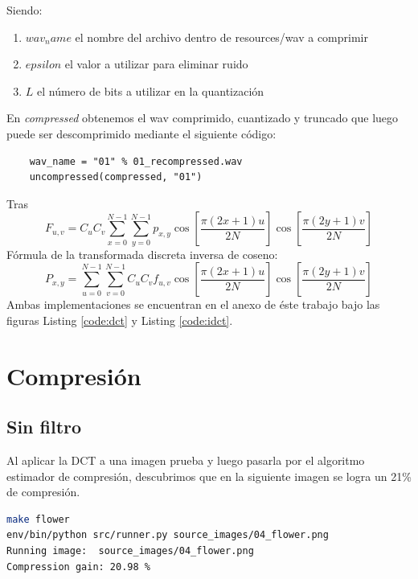 \documentclass[spanish]{scrartcl}
\begin{document}
Siendo:
\begin{enumerate}
    \item $wav_name$ el nombre del archivo dentro de resources/wav a comprimir
    \item $epsilon$ el valor a utilizar para eliminar ruido
    \item $L$ el número de bits a utilizar en la quantización
\end{enumerate}
En \textit{compressed} obtenemos el wav comprimido, cuantizado y truncado que luego puede ser descomprimido mediante el siguiente código:
\begin{lstlisting}
    wav_name = "01" % 01_recompressed.wav
    uncompressed(compressed, "01")
\end{lstlisting}
Tras
\begin{equation}
\label{eq:dct}
F_{u,v} =
 C_{u} C_{v} \sum_{x=0}^{N-1}
 \sum_{y=0}^{N-1}
 p_{x,y}
\cos \left[\frac{\pi \left(2 x + 1\right) u}{2 N} \right]
\cos \left[\frac{\pi \left(2 y + 1\right) v}{2 N} \right]
\end{equation}
Fórmula de la transformada discreta inversa de coseno\cite{mathworks_DCT}:
\begin{equation}
\label{eq:idct}
P_{x,y} =
 \sum_{u=0}^{N-1}
 \sum_{v=0}^{N-1}
 C_{u} C_{v}
 f_{u,v}
\cos \left[\frac{\pi \left(2 x + 1\right) u}{2 N} \right]
\cos \left[\frac{\pi \left(2 y + 1\right) v}{2 N} \right]
\end{equation}
Ambas implementaciones se encuentran en el anexo de éste trabajo bajo las figuras Listing \ref{code:dct} y Listing \ref{code:idct}.

\section{Compresión}
\subsection{Sin filtro}

Al aplicar la DCT a una imagen prueba y luego pasarla por el algoritmo estimador de compresión, descubrimos que en la siguiente imagen se logra un 21\% de compresión.
\begin{lstlisting}[language=bash]
make flower
env/bin/python src/runner.py source_images/04_flower.png
Running image:  source_images/04_flower.png
Compression gain: 20.98 %
\end{lstlisting}
\end{document}
